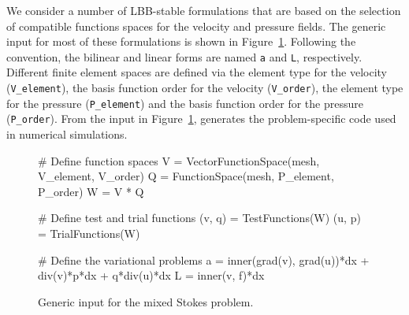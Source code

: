 We consider a number of LBB-stable formulations that are based on the
selection of compatible functions spaces for the velocity and pressure
fields.  The generic \ufl{} input for most of these formulations is shown in
Figure~\ref{code:terrel:var:mixed}.  Following the \ufl{} convention, the
bilinear and linear forms are named {\tt a} and {\tt L}, respectively.
Different finite element spaces are defined via the element type for
the velocity ({\tt V\_element}), the basis function order for the velocity
({\tt V\_order}), the element type for the pressure ({\tt P\_element}) and
the basis function order for the pressure ({\tt P\_order}). From the input
in Figure~\ref{code:terrel:var:mixed}, \ffc{} generates the problem-specific
code used in numerical simulations.
%
\begin{figure}
\begin{python}
# Define function spaces
V = VectorFunctionSpace(mesh, V_element, V_order)
Q = FunctionSpace(mesh, P_element, P_order)
W = V * Q

# Define test and trial functions
(v, q) = TestFunctions(W)
(u, p) = TrialFunctions(W)

# Define the variational problems
a = inner(grad(v), grad(u))*dx + div(v)*p*dx + q*div(u)*dx
L = inner(v, f)*dx
\end{python}
\caption{Generic \ufl{} input for the mixed Stokes problem.}
\label{code:terrel:var:mixed}
\end{figure}

